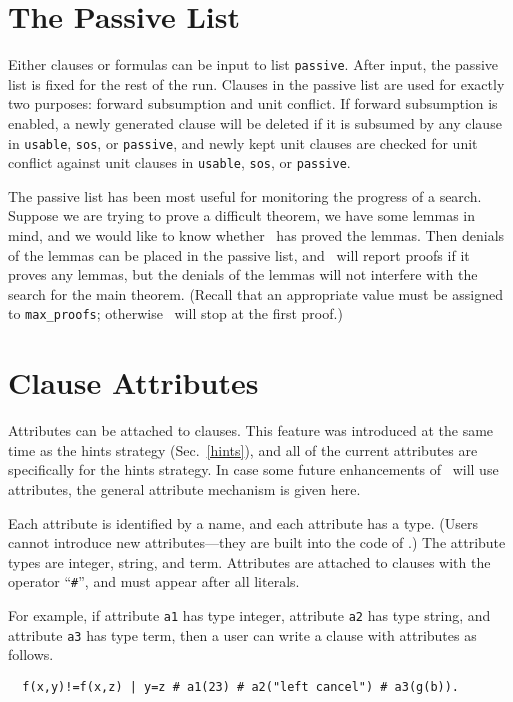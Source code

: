 \documentclass[11pt]{article}
\begin{document}
\section{The Passive List} \label{passive}

Either clauses or formulas can be input to list \verb:passive:.
After input, the passive
list is fixed for the rest of the run.  Clauses in the passive
list are used for exactly two purposes: forward subsumption and
unit conflict.  If forward subsumption is enabled, a newly
generated clause will be deleted if it is subsumed by any clause in
\verb:usable:, \verb:sos:, or \verb:passive:, and newly kept
unit clauses are checked for unit conflict against unit clauses in
\verb:usable:, \verb:sos:, or \verb:passive:.

The passive list has been most useful for monitoring the progress of a
search.  Suppose we are trying to prove a difficult theorem, we have
some lemmas in mind, and we would like to know whether \otter\ has proved
the lemmas.  Then denials of the lemmas can be placed in the passive
list, and \otter\ will report proofs if it proves any lemmas, but the
denials of the lemmas will not interfere with the search for the main
theorem.  (Recall that an appropriate value must be assigned to
\verb:max_proofs:; otherwise \otter\ will stop at the first proof.)

\section{Clause Attributes} \label{attributes}

Attributes can be attached to clauses.  This feature was introduced
at the same time as the hints strategy (Sec.~\ref{hints}),
and all of the current attributes are specifically for the hints strategy.
In case some future enhancements of \otter\ will use attributes,
the general attribute mechanism is given here.

Each attribute is identified by a name, and each attribute
has a type.  (Users cannot introduce new attributes---they
are built into the code of \otter.)
The attribute types are integer, string, and term.
Attributes are attached to clauses with
the operator ``\verb:#:'', and must appear after all literals.

For example, if
attribute \verb:a1: has type integer,
attribute \verb:a2: has type string, and
attribute \verb:a3: has type term, then
a user can write a clause with attributes as follows.

{\small
\begin{verbatim}
  f(x,y)!=f(x,z) | y=z # a1(23) # a2("left cancel") # a3(g(b)).
\end{verbatim}
}
\end{document}
